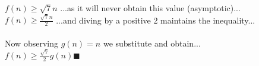 \documentclass[OPONE]{example}
\begin{document}
\begin{list}{}{}
$f(n) \geq \sqrt{7}n $ \hspace{1.65 in} ...as it will never obtain this value (asymptotic)...\\
$f(n) \geq \frac{\sqrt{7}n}{2} $ \hspace{1.65 in} ...and diving by a positive 2 maintains the inequality...\\
\\
Now observing $g(n) = n$  we substitute and obtain... \\
$f(n) \geq \frac{\sqrt{7}}{2}g(n)  \blacksquare$ \\
\\

\end{list}


\end{document}

